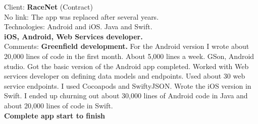 \documentclass{article}
\begin{document}

%
%
%

Client: 	\textbf  {RaceNet} (Contract) \\
No link: The app was replaced after several years. \\
Technologies: 	Android and iOS. Java and Swift. \\
\textbf{ 		iOS, Android, Web Services developer. } \\
Comments:	{\bf Greenfield development.} For the Android version I wrote about 20,000 lines of code in the first month. About 5,000 lines a week. GSon, Android studio. Got the basic version of the Android app completed. Worked with Web services developer on defining data models and endpoints. Used about 30 web service endpoints. I used Cocoapods and SwiftyJSON. Wrote the iOS version in Swift. I ended up churning out about 30,000 lines of Android code in Java and about 20,000 lines of code in Swift. \\
\textbf{Complete app start to finish} \\
\\
\end{document}
